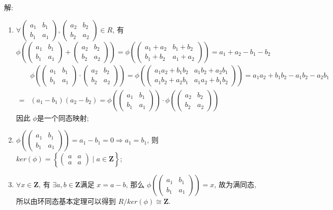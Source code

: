 \documentclass[a4paper,12pt]{ctexart}
\newcommand{\Z}{\mathbf{Z}}
\begin{document}
    解: \begin{enumerate}
      \item $ \forall \begin{pmatrix}a_1&b_1\\b_1&a_1\end{pmatrix},\begin{pmatrix}a_2&b_2\\b_2&a_2\end{pmatrix}\in R $, 有
      \[ \phi\left(\begin{pmatrix}a_1&b_1\\b_1&a_1\end{pmatrix}+\begin{pmatrix}a_2&b_2\\b_2&a_2\end{pmatrix}\right)=\phi\left(\begin{pmatrix}a_1+a_2&b_1+b_2\\b_1+b_2&a_1+a_2\end{pmatrix}\right)=a_1+a_2-b_1-b_2\]
      \begin{align*}
        &\phi\left(\begin{pmatrix}a_1&b_1\\b_1&a_1\end{pmatrix}\cdot\begin{pmatrix}a_2&b_2\\b_2&a_2\end{pmatrix}\right)=\phi\left(\begin{pmatrix}a_1a_2+b_1b_2&a_1b_2+a_2b_1\\a_1b_2+a_2b_1&a_1a_2+b_1b_2\end{pmatrix}\right)=a_1a_2+b_1b_2-a_1b_2-a_2b_1\\
        =&(a_1-b_1)(a_2-b_2)=\phi\left(\begin{pmatrix}a_1&b_1\\b_1&a_1\end{pmatrix}\right)\cdot\phi\left(\begin{pmatrix}a_2&b_2\\b_2&a_2\end{pmatrix}  \right)
      \end{align*}
      因此 $ \phi $是一个同态映射;
      \item $ \phi\left(\begin{pmatrix}a_1&b_1\\b_1&a_1\end{pmatrix}\right)=a_1-b_1=0\Rightarrow a_1=b_1 $, 则 $ ker(\phi)=\left\{\begin{pmatrix}a&a\\a&a\end{pmatrix}\mid a\in \Z\right\} $;
      \item $ \forall x\in\Z $, 有 $ \exists a,b\in\Z $满足 $ x=a-b $, 那么 $ \phi\left(\begin{pmatrix}a_1&b_1\\b_1&a_1\end{pmatrix}\right)=x $, 故为满同态,
      所以由环同态基本定理可以得到 $ R/ker(\phi)\cong\Z $.
      \end{enumerate}
\end{document}
